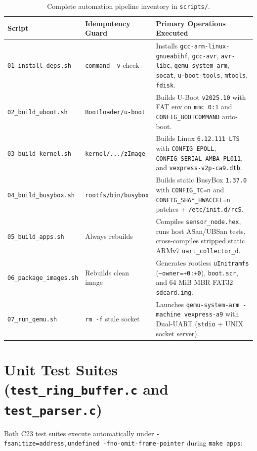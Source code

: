 \documentclass[11pt,a4paper,oneside]{report}
\begin{document}
\begin{table}[!htbp]
\centering
\caption{Complete automation pipeline inventory in \texttt{scripts/}.}
\label{tab:ch8_scripts}
\begin{tabularx}{\linewidth}{l l X}
\toprule
\textbf{Script} & \textbf{Idempotency Guard} & \textbf{Primary Operations Executed} \\
\midrule
\texttt{01\_install\_deps.sh} & \texttt{command -v} check & Installs \texttt{gcc-arm-linux-gnueabihf}, \texttt{gcc-avr}, \texttt{avr-libc}, \texttt{qemu-system-arm}, \texttt{socat}, \texttt{u-boot-tools}, \texttt{mtools}, \texttt{fdisk}. \\
\texttt{02\_build\_uboot.sh} & \texttt{Bootloader/u-boot} & Builds U-Boot \texttt{v2025.10} with FAT env on \texttt{mmc 0:1} and \texttt{CONFIG\_BOOTCOMMAND} auto-boot. \\
\texttt{03\_build\_kernel.sh} & \texttt{kernel/.../zImage} & Builds Linux \texttt{6.12.111 LTS} with \texttt{CONFIG\_EPOLL}, \texttt{CONFIG\_SERIAL\_AMBA\_PL011}, and \texttt{vexpress-v2p-ca9.dtb}. \\
\texttt{04\_build\_busybox.sh} & \texttt{rootfs/bin/busybox} & Builds static BusyBox \texttt{1.37.0} with \texttt{CONFIG\_TC=n} and \texttt{CONFIG\_SHA*\_HWACCEL=n} patches + \texttt{/etc/init.d/rcS}. \\
\texttt{05\_build\_apps.sh} & Always rebuilds & Compiles \texttt{sensor\_node.hex}, runs host ASan/UBSan tests, cross-compiles stripped static ARMv7 \texttt{uart\_collector\_d}. \\
\texttt{06\_package\_images.sh} & Rebuilds clean image & Generates rootless \texttt{uInitramfs} (\texttt{--owner=+0:+0}), \texttt{boot.scr}, and 64 MiB MBR FAT32 \texttt{sdcard.img}. \\
\texttt{07\_run\_qemu.sh} & \texttt{rm -f} stale socket & Launches \texttt{qemu-system-arm -machine vexpress-a9} with Dual-UART (\texttt{stdio} + UNIX socket server). \\
\bottomrule
\end{tabularx}
\end{table}

\section{Unit Test Suites (\texttt{test\_ring\_buffer.c} and \texttt{test\_parser.c})}

Both C23 test suites execute automatically under \texttt{-fsanitize=address,undefined -fno-omit-frame-pointer} during \texttt{make apps}:
\end{document}
